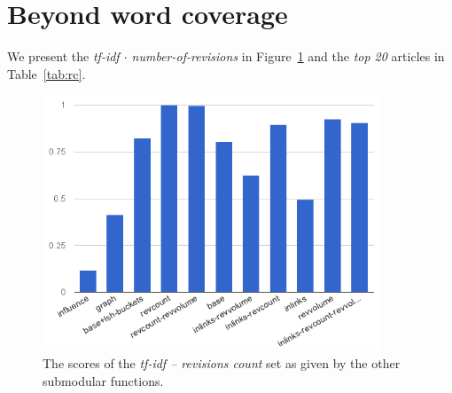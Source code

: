 \section{Beyond word coverage}

We present the \emph{tf-idf \(\cdot\) number-of-revisions} in
Figure~\ref{img:rc} and the \emph{top 20} articles in Table~\ref{tab:rc}.
\begin{figure}
  \centering
  \includegraphics[width=0.9\textwidth,natwidth=555,natheight=419]{images/rc.png}
  \caption{The scores of the \emph{tf-idf -- revisions count} set as given by
  the other submodular functions.}
  \label{img:rc}
\end{figure}
